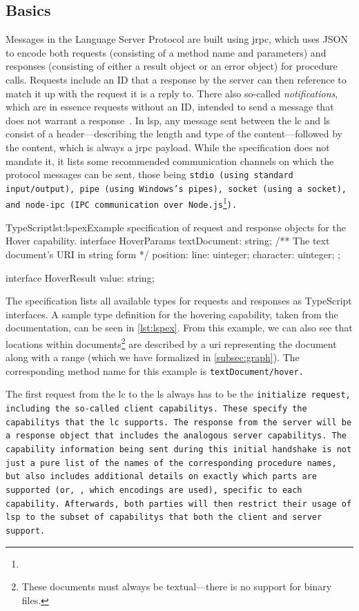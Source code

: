 \documentclass[../thesis]{subfiles}
\begin{document}
\subsection{Basics}\label{subsec:lspbasics}
Messages in the Language Server Protocol are built using \gls{jrpc}, which uses JSON to encode both requests (consisting of a method name and parameters) and responses (consisting of either a result object or an error object) for procedure calls.
Requests include an ID that a response by the server can then reference to match it up with the request it is a reply to.
There also so-called \emph{notifications}, which are in essence requests without an ID, intended to send a message that does not warrant a response~\cite{jsonrpc,json}.
In \gls{lsp}, any message sent between the \gls{lc} and \gls{ls} consist of a header---describing the length and type of the content---followed by the content, which is always a \gls{jrpc} payload.
While the specification does not mandate it, it lists some recommended communication channels on which the protocol messages can be sent, those being \tt{stdio} (using standard input/output), \tt{pipe} (using Windows's pipes), \tt{socket} (using a socket), and \tt{node-ipc} (IPC communication over Node.js\footnote{}).

\begin{codebox}{TypeScript}{lst:lspex}{Example specification of request and response objects for the Hover {capability}.}
interface HoverParams {
  textDocument: string; /** The text document's URI in string form */
  position: { line: uinteger; character: uinteger; };
}

interface HoverResult {
  value: string;
}
\end{codebox}\label{lst:lspex}

The specification lists all available types for requests and responses as TypeScript interfaces.
A sample type definition for the hovering \gls{capability}, taken from the documentation, can be seen in \cref{lst:lspex}.
From this example, we can also see that locations within documents\footnote{
	These documents must always be textual---there is no support for binary files.
} are described by a \gls*{uri} representing the document along with a \gls{range} (which we have formalized in \cref{subsec:graph}).
The corresponding method name for this example is \tt{textDocument/hover}.

The first request from the \gls{lc} to the \gls{ls} always has to be the \tt{initialize} request, including the so-called client \glspl{capability}.
These specify the \glspl{capability} that the \gls{lc} supports.
The response from the server will be a response object that includes the analogous server \glspl{capability}.
The \gls{capability} information being sent during this initial handshake is not just a pure list of the names of the corresponding procedure names, but also includes additional details on exactly which parts are supported (or, \eg, which encodings are used), specific to each \gls{capability}.
Afterwards, both parties will then restrict their usage of \gls{lsp} to the subset of \glspl{capability} that both the client and server support.
\end{document}

